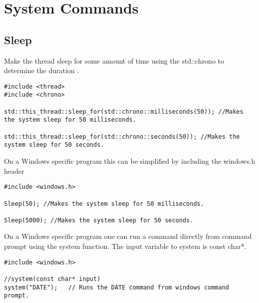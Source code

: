 \section{System Commands}

\subsection*{Sleep}
Make the thread sleep for some amount of time using the std::chrono to determine the duration \cite{cpp:chrono}.
\begin{lstlisting}
#include <thread>
#include <chrono>

std::this_thread::sleep_for(std::chrono::milliseconds(50)); //Makes the system sleep for 50 milliseconds.

std::this_thread::sleep_for(std::chrono::seconds(50)); //Makes the system sleep for 50 seconds.
\end{lstlisting}

On a Windows specific program this can be simplified by including the windows.h header
\begin{lstlisting}
#include <windows.h>

Sleep(50); //Makes the system sleep for 50 milliseconds.

Sleep(5000); //Makes the system sleep for 50 seconds.
\end{lstlisting}


On a Windows specific program one can run a command directly from command prompt using the system function. The input variable to system is const char*.
\begin{lstlisting}
#include <windows.h>

//system(const char* input)
system("DATE");   // Runs the DATE command from windows command prompt.
\end{lstlisting}













